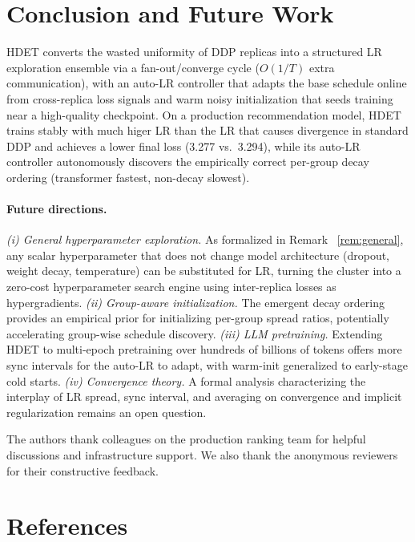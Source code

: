 \documentclass{article}
\begin{document}
\section{Conclusion and Future Work}
\label{sec:conclusion}

HDET converts the wasted uniformity of DDP replicas into a structured LR
exploration ensemble via a fan-out/converge cycle ($O(1/T)$ extra communication),
with an auto-LR controller that adapts the base schedule online from cross-replica
loss signals and warm noisy initialization that seeds training near a high-quality
checkpoint.
On a production recommendation model, HDET trains stably with much higer LR than the LR that
causes divergence in standard DDP and achieves a lower final loss (3.277 vs.\
3.294), while its auto-LR controller autonomously discovers the empirically correct
per-group decay ordering (transformer fastest, non-decay slowest).

\paragraph{Future directions.}
\textit{(i) General hyperparameter exploration.}
As formalized in Remark ~\ref{rem:general}, any scalar hyperparameter that does not
change model architecture (dropout, weight decay, temperature) can be substituted
for LR, turning the cluster into a zero-cost hyperparameter search engine using
inter-replica losses as hypergradients.
\textit{(ii) Group-aware initialization.}
The emergent decay ordering provides an empirical prior for initializing per-group
spread ratios, potentially accelerating group-wise schedule discovery.
\textit{(iii) LLM pretraining.}
Extending HDET to multi-epoch pretraining over hundreds of billions of tokens
offers more sync intervals for the auto-LR to adapt, with warm-init generalized to
early-stage cold starts.
\textit{(iv) Convergence theory.}
A formal analysis characterizing the interplay of LR spread, sync interval, and
averaging on convergence and implicit regularization remains an open question.

\begin{ack}
The authors thank colleagues on the production ranking team for helpful
discussions and infrastructure support.  We also thank the anonymous reviewers
for their constructive feedback.
\end{ack}

\section*{References}





\appendix


\newpage
% 
\end{document}
